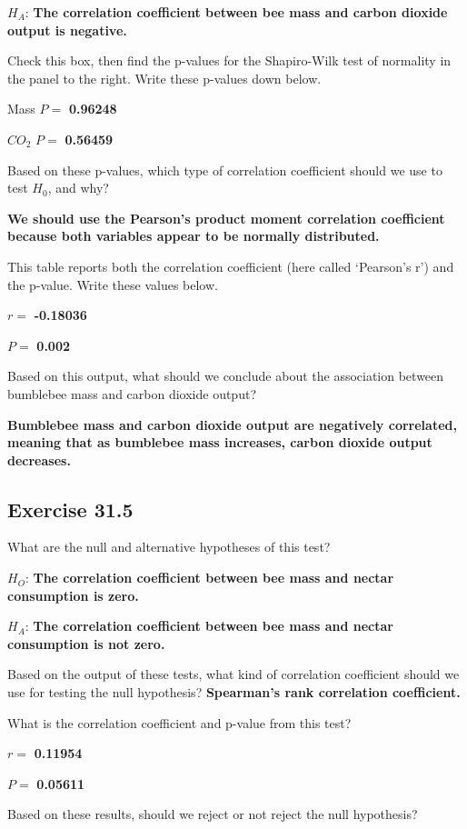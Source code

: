 \documentclass[
  openany]{krantz}
\begin{document}
\(H_{A}\): \textbf{The correlation coefficient between bee mass and carbon dioxide output is negative.}

Check this box, then find the p-values for the Shapiro-Wilk test of normality in the panel to the right. Write these p-values down below.

Mass \(P =\) \textbf{0.96248}

\(CO_2\) \(P =\) \textbf{0.56459}

Based on these p-values, which type of correlation coefficient should we use to test \(H_{0}\), and why?

\textbf{We should use the Pearson's product moment correlation coefficient because both variables appear to be normally distributed.}

This table reports both the correlation coefficient (here called `Pearson's r') and the p-value. Write these values below.

\(r =\) \textbf{-0.18036}

\(P =\) \textbf{0.002}

Based on this output, what should we conclude about the association between bumblebee mass and carbon dioxide output?

\textbf{Bumblebee mass and carbon dioxide output are negatively correlated, meaning that as bumblebee mass increases, carbon dioxide output decreases.}

\hypertarget{exercise-31.5}{%
\subsection{Exercise 31.5}\label{exercise-31.5}}

What are the null and alternative hypotheses of this test?

\(H_{O}\): \textbf{The correlation coefficient between bee mass and nectar consumption is zero.}

\(H_{A}\): \textbf{The correlation coefficient between bee mass and nectar consumption is not zero.}

Based on the output of these tests, what kind of correlation coefficient should we use for testing the null hypothesis? \textbf{Spearman's rank correlation coefficient.}

What is the correlation coefficient and p-value from this test?

\(r =\) \textbf{0.11954}

\(P =\) \textbf{0.05611}

Based on these results, should we reject or not reject the null hypothesis?
\end{document}
